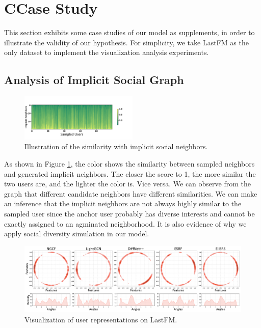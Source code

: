 \documentclass[letterpaper]{article} %
\begin{document}
\section{C{\quad}Case Study}
This section exhibits some case studies of our model as supplements, in order to illustrate the validity of our hypothesis. For simplicity, we take LastFM as the only dataset to implement the visualization analysis experiments. 
\subsection{Analysis of Implicit Social Graph}
\begin{figure}[ht!]
  \centering
  \includegraphics[width=0.5\textwidth]{implicit.pdf} %
  \caption{Illustration of the similarity with implicit social neighbors.}
  \label{fig_implicit}
\end{figure}
\noindent As shown in Figure \ref{fig_implicit}, the color shows the similarity between sampled neighbors and generated implicit neighbors. The closer the score to 1, the more similar the two users are, and the lighter the color is. Vice versa. We can observe from the graph that different candidate neighbors have different similarities. We can make an inference that the implicit neighbors are not always highly similar to the sampled user since the anchor user probably has diverse interests and cannot be exactly assigned to an agminated neighborhood. It is also evidence of why we apply social diversity simulation in our model.

\begin{figure}[ht]
  \centering
  \includegraphics[width=1.02\textwidth]{tsne.pdf} %
  \caption{Visualization of user representations on LastFM. }
  \label{fig_tsne}
\end{figure}
\end{document}
